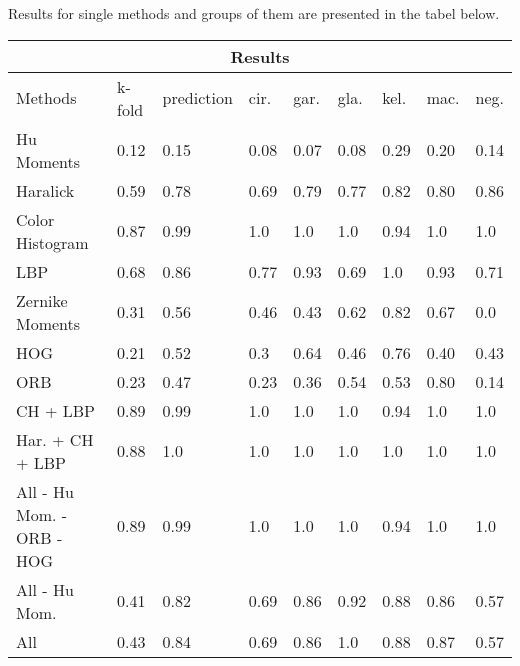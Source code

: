 \documentclass{article}
\begin{document}
Results for single methods and groups of them are presented in the tabel below. \\

\begin{tabular}{ |p{3cm}||p{1cm}|p{2cm}|p{1cm}|p{1cm}|p{1cm}|p{1cm}|p{1cm}|p{1cm}|  }
	\hline
	\multicolumn{9}{|c|}{Results} \\
	\hline
	Methods & k-fold & prediction & cir. & gar. & gla. & kel. & mac. & neg. \\
	\hline
	Hu Moments   &	0.12	&	0.15	&	0.08	&	0.07	&	0.08	&	0.29	&	0.20	&	0.14	\\
	Haralick	&	0.59	&	0.78	&	0.69	&	0.79	&	0.77	&	0.82	&	0.80	&	0.86	\\
	Color Histogram	&	0.87	&	0.99	&	1.0		&	1.0 	&	1.0		&	0.94	&	1.0		&	1.0	\\
	LBP	&	0.68	&	0.86	&	0.77	&	0.93	&	0.69	&	1.0 	&	0.93	&	0.71	\\
	Zernike Moments	&	0.31	&	0.56	&	0.46	&	0.43	&	0.62	&	0.82	&	0.67	&	0.0	\\
	HOG	&	0.21	&	0.52	&	0.3		&	0.64	&	0.46	&	0.76	&	0.40	&	0.43	\\
	ORB	&	0.23	&	0.47	&	0.23	&	0.36	&	0.54	&	0.53	&	0.80	&	0.14	\\
	CH + LBP	&	0.89	&	0.99	&	1.0 	&	1.0 	&	1.0 	&	0.94	&	1.0 	&	1.0 	\\
	Har. + CH + LBP	&	0.88	&	1.0		&	1.0 	&	1.0 	&	1.0		&	1.0 	&	1.0 	&	1.0	\\
	All - Hu Mom. - ORB - HOG	&	0.89	&	0.99	&	1.0 	&	1.0 	&	1.0 	&	0.94	&	1.0	&	1.0 	\\
	All - Hu Mom.	&	0.41	&	0.82	&	 0.69	&	0.86 	&	0.92	&	0.88	&	0.86	&	0.57	\\
	All &	0.43	&	0.84	&	0.69 	&	0.86 	&	1.0 	&	0.88	&	0.87	&	0.57	\\
	\hline
\end{tabular} \break
\end{document}
